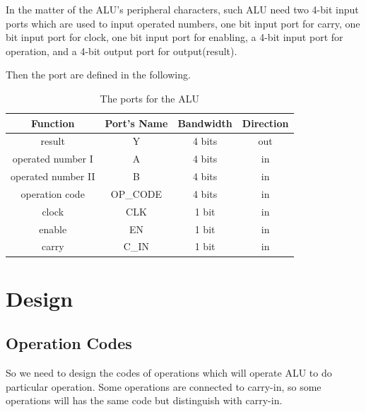 \documentclass{article}
\begin{document}
    In the matter of the ALU's peripheral characters,
    such ALU need two 4-bit input ports which are used to input operated numbers,
    one bit input port for carry, one bit input port for clock,
    one bit input port for enabling, a 4-bit input port for operation, and a 4-bit output port for output(result).
    
    Then the port are defined in the following.
    \begin{table}
        \centering
        \begin{tabular}{|c|c|c|c|}
            \hline Function & Port's Name & Bandwidth & Direction \\
            \hline result             & Y        & 4 bits & out \\
            \hline operated number I  & A        & 4 bits & in \\
            \hline operated number II & B        & 4 bits & in \\
            \hline operation code     & OP\_CODE & 4 bits & in \\
            \hline clock              & CLK      & 1 bit  & in \\
            \hline enable             & EN       & 1 bit  & in \\
            \hline carry              & C\_IN    & 1 bit  & in \\
            \hline
        \end{tabular}
        \caption{The ports for the ALU}
        \label{tab:alu:port}
    \end{table}
    
    \section{Design}
    \label{sec:design}
    
    \subsection{Operation Codes}
    \label{sec:desgin:code}
    
    So we need to design the codes of operations which will operate ALU to do particular operation.
    Some operations are connected to carry-in, so some operations will has the same code but distinguish with carry-in.
    
\end{document}
